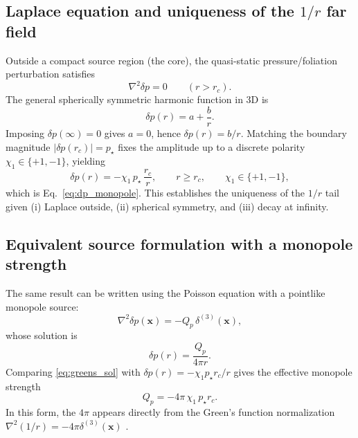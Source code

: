 \documentclass[pdflatex,sn-mathphys-num]{revtex4-2}
\providecommand{\rc}{r_c}
\begin{document}
    \subsection{Laplace equation and uniqueness of the \(1/r\) far field}
        Outside a compact source region (the core), the quasi-static pressure/foliation perturbation satisfies
        \begin{equation}
            \nabla^2 \delta p = 0 \qquad (r>\rc).
        \end{equation}
        The general spherically symmetric harmonic function in 3D is
        \begin{equation}
            \delta p(r)=a+\frac{b}{r}.
        \end{equation}
        Imposing \(\delta p(\infty)=0\) gives \(a=0\), hence \(\delta p(r)=b/r\).
        Matching the boundary magnitude \(|\delta p(\rc)|=p_\star\) fixes the amplitude up to a discrete polarity
        \(\chi_1\in\{+1,-1\}\), yielding
        \begin{equation}
            \delta p(r) = -\chi_1\,p_\star\,\frac{\rc}{r},\qquad r\ge \rc,\qquad \chi_1\in\{+1,-1\},
        \end{equation}
        which is Eq.~\eqref{eq:dp_monopole}. This establishes the uniqueness of the \(1/r\) tail given (i) Laplace outside,
        (ii) spherical symmetry, and (iii) decay at infinity.

    \subsection{Equivalent source formulation with a monopole strength}
        The same result can be written using the Poisson equation with a pointlike monopole source:
        \begin{equation}
            \nabla^2 \delta p(\mathbf{x}) = -Q_p\,\delta^{(3)}(\mathbf{x}),
            \label{eq:poisson_source}
        \end{equation}
        whose solution is
        \begin{equation}
            \delta p(r) = \frac{Q_p}{4\pi r}.
            \label{eq:greens_sol}
        \end{equation}
        Comparing \eqref{eq:greens_sol} with \(\delta p(r)=-\chi_1 p_\star \rc/r\) gives the effective monopole strength
        \begin{equation}
            Q_p = -4\pi\,\chi_1\,p_\star \rc.
            \label{eq:Qp}
        \end{equation}
        In this form, the \(4\pi\) appears directly from the Green's function normalization
        \(\nabla^2(1/r)=-4\pi \delta^{(3)}(\mathbf{x})\) \cite{Jackson1999}.
\end{document}
